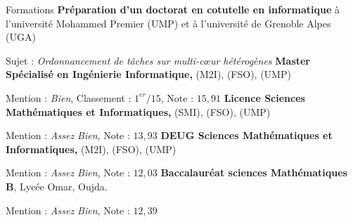 \begin{rubric}{Formations}
\entry*[$2015$ -- $2018$]%
	\textbf{Préparation d'un doctorat en cotutelle en informatique} à l'université Mohammed Premier (UMP) et à l'université de Grenoble Alpes (UGA)
	\par Sujet : \emph{Ordonnancement de tâches sur multi-cœur hétérogènes}
%
\entry*[$2014$]%
	\textbf{Master Spécialisé en Ingénierie Informatique,} (M2I), (FSO), (UMP)\par
	Mention : \emph{Bien}, Classement : $1^{er}/15$, Note : $15,91$ 
%
\entry*[$2012$]%
	\textbf{Licence Sciences Mathématiques et Informatiques,} (SMI), (FSO), (UMP) \par
	Mention : \emph{Assez Bien}, Note :  $13,93$
%
\entry*[$2011$]%
	\textbf{DEUG Sciences Mathématiques et Informatiques,} (M$2$I), (FSO), (UMP)\par
	Mention : \emph{Assez Bien}, Note : $12,03$
%
\entry*[$2008$]%
	\textbf{Baccalauréat sciences Mathématiques B}, Lycée Omar, Oujda.\par
	Mention : \emph{Assez Bien}, Note : $12,39$
%
\end{rubric}
